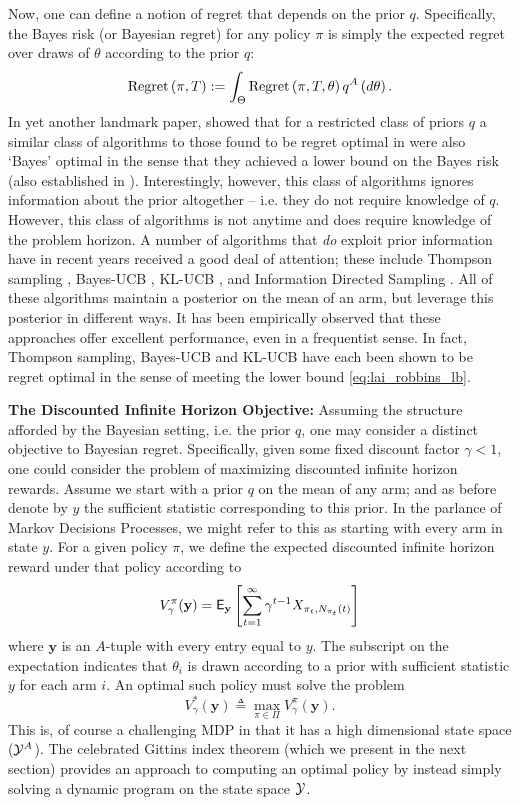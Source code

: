 Now, one can define a notion of regret that depends on the prior $q$. Specifically, the Bayes risk (or Bayesian regret) for any policy $\pi$ is simply the expected regret over draws of $\theta$ according to the prior $q$:
\[
\textnormal{Regret} \left( \pi, T \right) := \int_\Theta \textnormal{Regret} \left( \pi, T, \theta \right) q^A\left(d\theta\right).
\]
In yet another landmark paper, \cite{lai1987adaptive} showed that for a restricted class of priors $q$ a similar class of algorithms to those found to be regret optimal in \citep{lai1985asymptotically} were {also `Bayes' optimal in the sense that they achieved a lower bound on the Bayes risk (also established in \cite{lai1987adaptive})}. Interestingly, however, this class of algorithms ignores information about the prior altogether -- i.e. they do not require knowledge of $q$.
However, this class of algorithms is not anytime and does require knowledge of the problem horizon.
A number of algorithms that {\em do} exploit prior information have in recent years received a good deal of attention; these include Thompson sampling \citep{thompson1933likelihood}, Bayes-UCB \citep{kaufmann2012thompson}, KL-UCB \citep{garivier2011kl}, and Information Directed Sampling \citep{russo2014learning}. All of these algorithms maintain a posterior on the mean of an arm, but leverage this posterior in different ways. It has been empirically observed that these approaches offer excellent performance, even in a frequentist sense. In fact, Thompson sampling, Bayes-UCB and KL-UCB have each been shown to be regret optimal in the sense of meeting the lower bound  \eqref{eq:lai_robbins_lb}. 
 
\noindent\textbf{\textsf{The Discounted Infinite Horizon Objective: }}Assuming the structure afforded by the Bayesian setting, i.e. the prior $q$, one may consider a distinct objective to Bayesian regret. Specifically, given some fixed discount factor $\gamma < 1$, one could consider the problem of maximizing discounted infinite horizon rewards. Assume we start with a prior $q$ on the mean of any arm; and as before denote by $y$ the sufficient statistic corresponding to this prior. In the parlance of Markov Decisions Processes, we might refer to this as starting with every arm in state $y$. For a given policy $\pi$, we define the expected discounted infinite horizon reward under that policy according to
\[
V^\pi_\gamma(\mathbf{y}) 
=
\mathsf{E}_{\mathbf{y}}
\left[
	\sum_{t=1}^\infty \gamma^{t-1} X_{\pi_t,N_{\pi_t}(t)}
\right]
\]
where $\mathbf{y}$ is an $A$-tuple with every entry equal to $y$. The subscript on the expectation indicates that $\theta_i$ is drawn according to a prior with sufficient statistic $y$ for each arm $i$. An optimal such policy must solve the problem
\[
V^*_\gamma(\mathbf{y}) 
\triangleq 
\max_{\pi \in \Pi} V^\pi_\gamma(\mathbf{y}). 
\]
This is, of course a challenging MDP in that it has a high dimensional state space ($\mathcal Y^A$). The celebrated Gittins index theorem (which we present in the next section) provides an approach to computing an optimal policy by instead simply solving a dynamic program on the state space $\mathcal Y$. 


